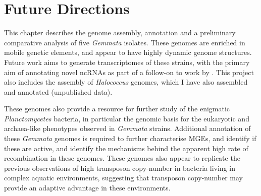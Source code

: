 \section{Future Directions}
This chapter describes the genome assembly, annotation and a preliminary comparative analysis of five \textit{Gemmata} isolates. These genomes are enriched in mobile genetic elements, and appear to have highly dynamic genome structures. Future work aims to generate transcriptomes of these strains, with the primary aim of annotating novel ncRNAs as part of a follow-on to work by \cite{Lindgreen2014-plplvr}. This project also includes the assembly of \textit{Halococcus} genomes, which I have also assembled and annotated (unpublished data). 

These genomes also provide a resource for further study of the enigmatic\textit{ Planctomycetes} bacteria, in particular the genomic basis for the eukaryotic and archaea-like phenotypes observed in \textit{Gemmata} strains. Additional annotation of these \textit{Gemmata} genomes is required to further characterise MGEs, and identify if these are active, and identify the mechanisms behind the apparent high rate of recombination in these genomes. These genomes also appear to replicate the previous observations of high transposon copy-number in bacteria living in complex aquatic environments, suggesting that transposon copy-number may provide an adaptive advantage in these environments. 



